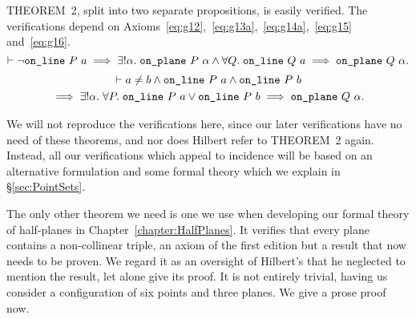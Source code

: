 THEOREM~2, split into two separate propositions, is easily verified. The verifications depend on Axioms~\ref{eq:g12},~\ref{eq:g13a},~\ref{eq:g14a},~\ref{eq:g15} and~\ref{eq:g16}.
\begin{displaymath}
  \vdash\neg\texttt{on\_line}\ P\ a \implies \exists!\alpha.\; \texttt{on\_plane}\ P\ \alpha \wedge \forall Q.\; \texttt{on\_line}\ Q\ a \implies \texttt{on\_plane}\ Q\ \alpha.
\end{displaymath}
\begin{multline*}
  \vdash a\neq b\wedge\texttt{on\_line}\ P\ a\wedge\texttt{on\_line}\ P\ b\\
  \implies\exists!\alpha.\; \forall P.\; \texttt{on\_line}\ P\ a \vee \texttt{on\_line}\ P\ b \implies\texttt{on\_plane}\ Q\ \alpha.
\end{multline*}

We will not reproduce the verifications here, since our later verifications have no need of these theorems, and nor does Hilbert refer to THEOREM~2 again. Instead, all our verifications which appeal to incidence will be based on an alternative formulation and some formal theory which we explain in \S\ref{sec:PointSets}.

The only other theorem we need is one we use when developing our formal theory of half-planes in Chapter~\ref{chapter:HalfPlanes}. It verifies that every plane contains a non-collinear triple, an axiom of the first edition but a result that now needs to be proven. We regard it as an oversight of Hilbert's that he neglected to mention the result, let alone give its proof. It is not entirely trivial, having us consider a configuration of six points and three planes. We give a prose proof now.

